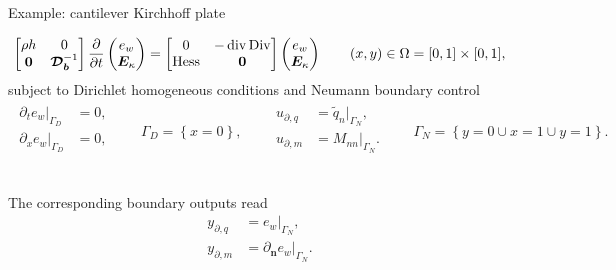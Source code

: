 \documentclass[aspectratio=169]{ISAE-Beamer}
\DeclareMathOperator*{\Div}{Div}
\renewcommand{\div}{\operatorname{div}}
\DeclareMathOperator*{\Hess}{Hess}
\begin{document}
\begin{frame}{Example: cantilever Kirchhoff plate}

\begin{equation*}
\begin{bmatrix}
\rho h & 0 \\ 
\bm{0} & \bm{\mathcal{D}_b}^{-1} \\
\end{bmatrix}
\diffp{}{t}
\begin{pmatrix}
e_w \\ \bm{E}_\kappa \\
\end{pmatrix} = 
\begin{bmatrix}
0 & -\div\Div \\ 
\Hess & \bm{0} \\
\end{bmatrix}
\begin{pmatrix}
e_w \\ \bm{E}_\kappa \\
\end{pmatrix} \qquad (x, y) \in \Omega = [0, 1]\times[0,1],
\end{equation*}
subject to Dirichlet homogeneous conditions and Neumann boundary control
\begin{align*}
\begin{aligned}
\partial_t e_w|_{\Gamma_D} &= 0, \\
\partial_x e_w|_{\Gamma_D} &= 0, \\
\end{aligned} \qquad {\Gamma_D} = \left\{x = 0 \right\}, \qquad
\begin{aligned}
u_{\partial, q} & = \widetilde{q}_n|_{\Gamma_N},\\
u_{\partial, m} &= M_{nn}|_{\Gamma_N}.\\
\end{aligned} \qquad {\Gamma_N} = \left\{y = 0 \cup x=1 \cup y=1 \right\}.
\end{align*}

\begin{columns}
	\begin{column}{.5\textwidth}
		The corresponding boundary outputs read
		\begin{equation*}
		\begin{aligned}
		y_{\partial, q} &= e_w|_{\Gamma_N}, \\
		y_{\partial, m} &=\partial_{\bm{n}} e_w|_{\Gamma_N}.
		\end{aligned}
		\end{equation*}
	\end{column}


\end{columns}
\end{frame}
\end{document}
